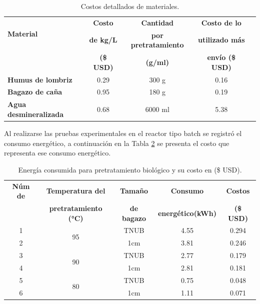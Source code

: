 \documentclass[12pt]{article}
\begin{document}
\begin{table}[H]
	\centering
	
	\caption{Costos detallados de materiales.}
	\label{tab:costos_completos}
	\footnotesize
	\setlength{\tabcolsep}{2.5pt}
	\begin{tabular}{|l|c|c|c|c|}
		\hline
		\multirow{2}{*}{\textbf{Material}} & \textbf{Costo} & \textbf{Cantidad} &  \textbf{Costo de lo} \\
		& \textbf{ de kg/L} & \textbf{ por pretratamiento}  &  \textbf{utilizado más} \\
		& \textbf{ (\$ USD)} & \textbf{(g/ml)}  & \textbf{envío (\$ USD)} \\
		\hline
		\textbf{Humus de lombriz} & 0.29 & 300 g &   0.16 \\
		\hline
		\textbf{Bagazo de caña} & 0.95 & 180 g &   0.19 \\
		\hline
		\textbf{Agua desmineralizada} & 0.68 & 6000 ml &  5.38 \\
		\hline
	\end{tabular}
\end{table}

Al realizarse las pruebas experimentales en el reactor tipo batch se registró el consumo energético, a continuación en la Tabla \ref{tabla de energia} se presenta el costo que representa ese consumo energético.
	
	
	\begin{table}[H]
		\centering
		\caption{Energía consumida para pretratamiento biológico  y su costo en (\$ USD). }
		\label{tabla de energia}
	\setlength{\tabcolsep}{2.5pt}
		\begin{tabular}{|c|c|c|c|c|}
			\hline
		\textbf{Núm de}&\textbf{Temperatura del} & \textbf{Tamaño }  & \textbf{ Consumo } & \textbf{Costos } \\ 
			&\textbf{ pretratamiento (°C)} &	\textbf{ de bagazo}  & 	\textbf{energético(kWh) }& 	\textbf{(\$ USD)} \\ \hline
     1  & \multirow{2}{*}{95} & TNUB & 4.55 & 0.294 \\ \cline{3-5} \cline{1-1}
2	& & 1cm & 3.81 & 0.246 \\ \hline 
3&\multirow{2}{*}{90} & TNUB & 2.77 & 0.179 \\ \cline{3-5} \cline{1-1}
4	& & 1cm & 2.81 & 0.181  \\ \hline 
5&\multirow{2}{*}{80}	 & TNUB & 0.75 & 0.048  \\ \cline{3-5} \cline{1-1}
6&	 & 1cm & 1.11 & 0.071  \\ 	\hline		
		\end{tabular}
	
	\end{table}
	
\end{document}
